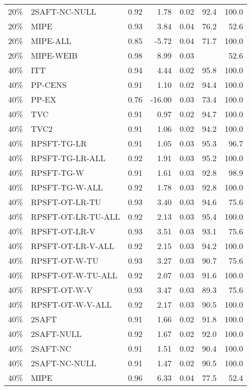 \begin{table}[ht]
{\begin{tabular}{llrrrrr}
  20\% & 2SAFT-NC-NULL & 0.92 & 1.78 & 0.02 & 92.4 & 100.0 \\ 
  20\% & MIPE & 0.93 & 3.84 & 0.04 & 76.2 & 52.6 \\ 
  20\% & MIPE-ALL & 0.85 & -5.72 & 0.04 & 71.7 & 100.0 \\ 
  20\% & MIPE-WEIB & 0.98 & 8.99 & 0.03 &  & 52.6 \\ 
   \hline
40\% & ITT & 0.94 & 4.44 & 0.02 & 95.8 & 100.0 \\ 
  40\% & PP-CENS & 0.91 & 1.10 & 0.02 & 94.4 & 100.0 \\ 
  40\% & PP-EX & 0.76 & -16.00 & 0.03 & 73.4 & 100.0 \\ 
  40\% & TVC & 0.91 & 0.97 & 0.02 & 94.7 & 100.0 \\ 
  40\% & TVC2 & 0.91 & 1.06 & 0.02 & 94.2 & 100.0 \\ 
   \hline
40\% & RPSFT-TG-LR & 0.91 & 1.05 & 0.03 & 95.3 & 96.7 \\ 
  40\% & RPSFT-TG-LR-ALL & 0.92 & 1.91 & 0.03 & 95.2 & 100.0 \\ 
  40\% & RPSFT-TG-W & 0.91 & 1.61 & 0.03 & 92.8 & 98.9 \\ 
  40\% & RPSFT-TG-W-ALL & 0.92 & 1.78 & 0.03 & 92.8 & 100.0 \\ 
  40\% & RPSFT-OT-LR-TU & 0.93 & 3.40 & 0.03 & 94.6 & 75.6 \\ 
  40\% & RPSFT-OT-LR-TU-ALL & 0.92 & 2.13 & 0.03 & 95.4 & 100.0 \\ 
  40\% & RPSFT-OT-LR-V & 0.93 & 3.51 & 0.03 & 93.1 & 75.6 \\ 
  40\% & RPSFT-OT-LR-V-ALL & 0.92 & 2.15 & 0.03 & 94.2 & 100.0 \\ 
   \hline
40\% & RPSFT-OT-W-TU & 0.93 & 3.27 & 0.03 & 90.7 & 75.6 \\ 
  40\% & RPSFT-OT-W-TU-ALL & 0.92 & 2.07 & 0.03 & 91.6 & 100.0 \\ 
  40\% & RPSFT-OT-W-V & 0.93 & 3.47 & 0.03 & 89.3 & 75.6 \\ 
  40\% & RPSFT-OT-W-V-ALL & 0.92 & 2.17 & 0.03 & 90.5 & 100.0 \\ 
   \hline
40\% & 2SAFT & 0.91 & 1.66 & 0.02 & 91.8 & 100.0 \\ 
  40\% & 2SAFT-NULL & 0.92 & 1.67 & 0.02 & 92.0 & 100.0 \\ 
  40\% & 2SAFT-NC & 0.91 & 1.51 & 0.02 & 90.4 & 100.0 \\ 
  40\% & 2SAFT-NC-NULL & 0.91 & 1.47 & 0.02 & 90.5 & 100.0 \\ 
  40\% & MIPE & 0.96 & 6.33 & 0.04 & 77.5 & 52.4 \\ 

\end{tabular}}
\end{table}
